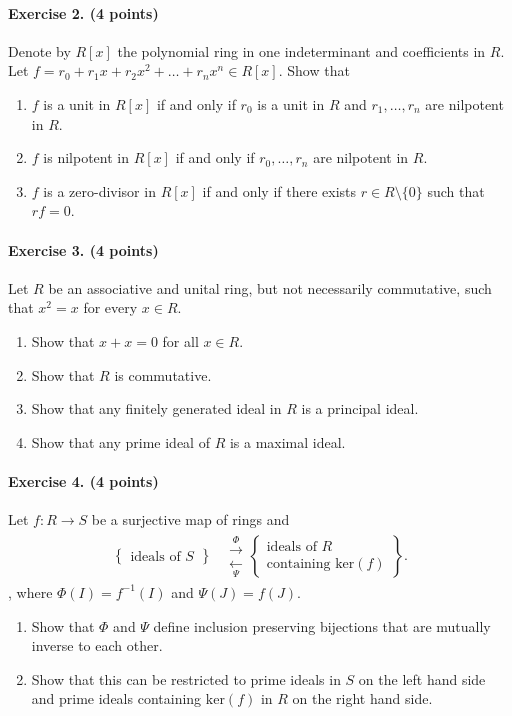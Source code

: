 \documentclass[12pt,a4paper]{article}
\begin{document}
\paragraph{Exercise 2. (4 points)}
Denote by $R[x]$ the polynomial ring in one indeterminant and coefficients in $R$. Let $f = r_0 + r_1 x + r_2 x^2 + \ldots + r_n x^n \in R[x]$. Show that
\begin{enumerate}
\item $f$ is a unit in $R[x]$ if and only if $r_0$ is a unit in $R$ and $r_1,\ldots,r_n$ are nilpotent in $R$.
\item $f$ is nilpotent in $R[x]$ if and only if $r_0,\ldots,r_n$ are nilpotent in $R$.
\item $f$ is a zero-divisor in $R[x]$ if and only if there exists $r \in R \setminus \{0\}$ such that $rf=0$.
\end{enumerate}

\paragraph{Exercise 3. (4 points)}
Let $R$ be an associative and unital ring, but not necessarily commutative, such that $x^2 = x$ for every $x \in R$.
\begin{enumerate}
\item Show that $x+x=0$ for all $x \in R$.
\item Show that $R$ is commutative.
\item Show that any finitely generated ideal in $R$ is a principal ideal.
\item Show that any prime ideal of $R$ is a maximal ideal.
\end{enumerate}

\paragraph{Exercise 4. (4 points)}
Let $f:R \rightarrow S$ be a surjective map of rings and
\begin{align*}
\left\lbrace \begin{array}{c}
\text{ideals of $S$}
\end{array}
\right\rbrace
&\begin{array}{c} \overset{\Phi}{\longrightarrow} \\ \underset{\Psi}{\longleftarrow}
\end{array}
\left\lbrace \begin{array}{c}
\text{ideals of $R$} \\ \text{containing } \mathrm{ker}(f)
\end{array}
\right\rbrace.
\end{align*},
where $\Phi(I) = f^{-1}(I)$ and $\Psi(J)=f(J)$.
\begin{enumerate}
\item Show that $\Phi$ and $\Psi$ define inclusion preserving bijections that are mutually inverse to each other.
\item Show that this can be restricted to prime ideals in $S$ on the left hand side and prime ideals containing $\mathrm{ker}(f)$ in $R$ on the right hand side.
\end{enumerate}
\end{document}
